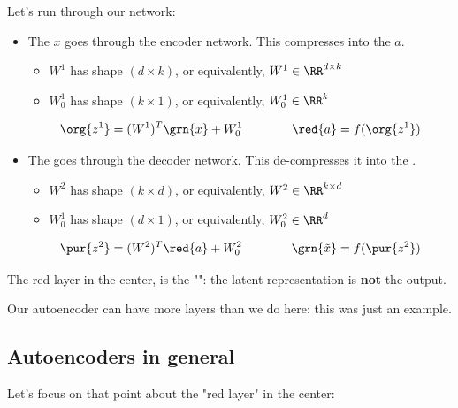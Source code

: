         Let's run through our network:

        \begin{itemize}
            \item The  $x$ goes through the encoder network. This compresses into the  $a$.
                \begin{itemize}
                    \item $W^1$ has shape $(d \times k)$, or equivalently, $W^1 \in \RR^{d \times k}$
                    \item $W^1_0$ has shape $(k \times 1)$, or equivalently, $W^1_0 \in \RR^k$
                \end{itemize}

            \begin{equation}
                \org{z^1} = (W^1)^T \grn{x} + W^1_0 \qquad \qquad \red{a} = f(\org{z^1})
            \end{equation}

            \item The  goes through the decoder network. This de-compresses it into the .
                \begin{itemize}
                    \item $W^2$ has shape $(k \times d)$, or equivalently, $W^2 \in \RR^{k \times d}$
                    \item $W^1_0$ has shape $(d \times 1)$, or equivalently, $W^2_0 \in \RR^d$
                \end{itemize}

                \begin{equation}
                \pur{z^2} = (W^2)^T\red{a} + W^2_0 \qquad \qquad \grn{\tilde{x}} = f(\pur{z^2})
            \end{equation}
        \end{itemize}

        The red layer in the center, is the "": the latent representation is \textbf{not} the output.

        Our autoencoder can have more layers than we do here: this was just an example.

    \subsection{Autoencoders in general}

        Let's focus on that point about the "red layer" in the center:\\

